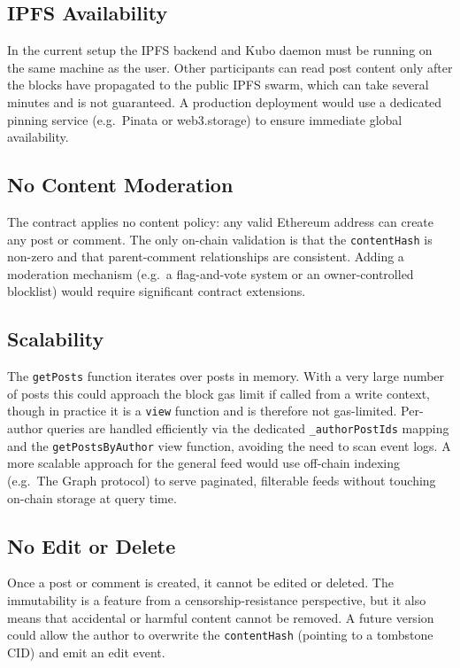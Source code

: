 \documentclass[11pt]{article}
\begin{document}
\subsection{IPFS Availability}

In the current setup the IPFS backend and Kubo daemon must be running on the same machine as the user. Other participants can read post content only after the blocks have propagated to the public IPFS swarm, which can take several minutes and is not guaranteed. A production deployment would use a dedicated pinning service (e.g.\ Pinata or web3.storage) to ensure immediate global availability.

\subsection{No Content Moderation}

The contract applies no content policy: any valid Ethereum address can create any post or comment. The only on-chain validation is that the \texttt{contentHash} is non-zero and that parent-comment relationships are consistent. Adding a moderation mechanism (e.g.\ a flag-and-vote system or an owner-controlled blocklist) would require significant contract extensions.

\subsection{Scalability}

The \texttt{getPosts} function iterates over posts in memory. With a very large number of posts this could approach the block gas limit if called from a write context, though in practice it is a \texttt{view} function and is therefore not gas-limited. Per-author queries are handled efficiently via the dedicated \texttt{\_authorPostIds} mapping and the \texttt{getPostsByAuthor} view function, avoiding the need to scan event logs. A more scalable approach for the general feed would use off-chain indexing (e.g.\ The Graph protocol) to serve paginated, filterable feeds without touching on-chain storage at query time.

\subsection{No Edit or Delete}

Once a post or comment is created, it cannot be edited or deleted. The immutability is a feature from a censorship-resistance perspective, but it also means that accidental or harmful content cannot be removed. A future version could allow the author to overwrite the \texttt{contentHash} (pointing to a tombstone CID) and emit an edit event.
\end{document}
